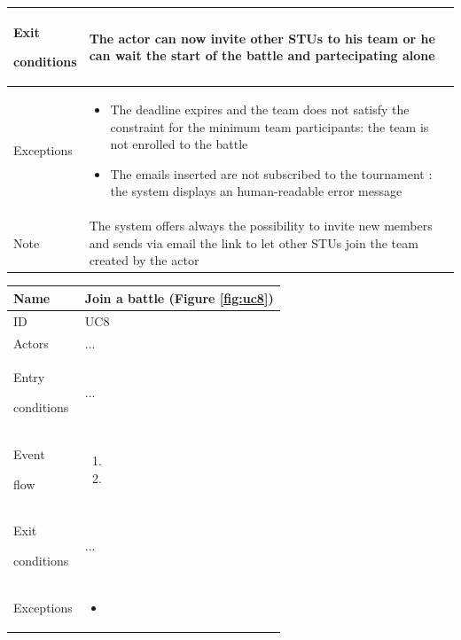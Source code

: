 \begin{center}
\begin{tabular}{| m{2cm} | m{10cm}|}
        Exit \par conditions  & The actor can now invite other STUs to his team or he can wait the start of the battle and partecipating alone                              \\ \hline
        Exceptions            & \begin{itemize} 
                                    \item The deadline expires and the team does not satisfy the constraint for the minimum team participants: the team is not enrolled to the battle 
                                    \item The emails inserted are not subscribed to the tournament : the system displays an human-readable error message    
                                \end{itemize} \\ \hline
        Note                  & The system offers always the possibility to invite new members and sends via email the link to let other STUs join the team created by the actor \\ \hline
    \end{tabular}
\end{center}

\begin{center}
    \def\arraystretch{1.5}
    \begin{tabular}{| m{2cm} | m{10cm}|}
        \hline
        Name                  & Join a battle  (Figure \ref{fig:uc8})                                                                                                               \\ \hline
        ID                    & UC8                                                                                                                             \\ \hline
        Actors                & ... \\ \hline
        Entry \par conditions & ... \\ \hline
        Event \par flow       & \begin{enumerate}
                                    \item 
                                    \item 
                                \end{enumerate} \\ \hline
        Exit \par conditions  & ... \\ \hline
        Exceptions            & \begin{itemize}
                                    \item 
                                \end{itemize} \\ \hline
    \end{tabular}
\end{center}

